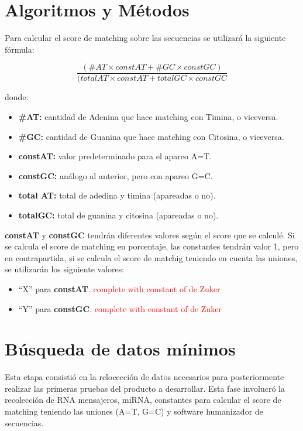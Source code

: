 \documentclass[12pt,a4paper,spanish]{article}
\begin{document}
\section{Algoritmos y Métodos}
	\par Para calcular el score de matching sobre las secuencias se utilizará la siguiente fórmula:

		\begin{equation}	
			\frac{(\#AT \times constAT + \#GC \times constGC)}{(totalAT \times constAT + totalGC \times constGC}
		\end{equation}	

		\par donde:
		\begin{itemize}
			\item \textbf{\#AT:} cantidad de Adenina que hace matching con Timina, o viceversa.
			\item \textbf{\#GC:} cantidad de Guanina que hace matching con Citosina, o viceversa.
			\item \textbf{constAT:} valor predeterminado para el apareo A=T.
			\item \textbf{constGC:} análogo al anterior, pero con apareo G=C.
			\item \textbf{total AT:} total de adedina y timina (apareadas o no).
			\item \textbf{totalGC:} total de guanina y citosina (apareadas o no).	
		\end{itemize}

	\par \textbf{constAT} y \textbf{constGC} tendrán diferentes valores según el score que se calculé. Si se calcula el 	score de matching en porcentaje, las constantes tendrán valor 1, pero en contrapartida, si se calcula el score de 		matchig teniendo en cuenta las uniones, se utilizarán los siguiente valores:
	\begin{itemize}
		\item ``X'' para \textbf{constAT}. \textcolor{red}{complete with constant of de Zuker}
		\item ``Y'' para \textbf{constGC}. \textcolor{red}{complete with constant of de Zuker}
	\end{itemize}

\section{Búsqueda de datos mínimos}
	\par Esta etapa consistió en la relocección de datos necesarios para posteriormente realizar las primeras pruebas del 		producto a desarrollar. Esta fase involucró la recolección de RNA mensajeros, miRNA, constantes para calcular el score 		de matching teniendo las uniones (A=T, G=C) y software humanizador de secuencias.
\end{document}
